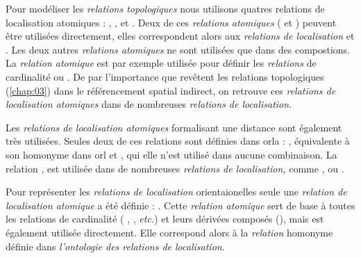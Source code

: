Pour modéliser les \emph{relations topologiques} nous utilisons
quatres relations de localisation atomiques :
,
,
 et . Deux de
ces \emph{relations atomiques} ( et
) peuvent être utilisées
directement, elles correspondent alors aux \emph{relations de
  localisation}  et
. Les deux autres \emph{relations
  atomiques} ne sont utilisées que dans des compostions. La
\emph{relation atomique}  est par
exemple utilisée pour définir les \emph{relations} de cardinalité
 ou
. De par l'importance que
revêtent les relations topologiques (\autoref{chap:03}) dans le
référencement spatial indirect, on retrouve ces \emph{relations de
  localisation atomiques} dans de nombreuses \emph{relations de
  localisation.}

Les \emph{relations de localisation atomiques} formalisant une
distance sont également très utilisées. Seules deux de ces relations
sont définies dans \ac{orla}
: ,
équivalente à son homonyme dans \ac{orl} et
, qui elle n'est utilisé dans
aucune combinaison. La relation
,
est utilisée dans de nombreuses \emph{relations de localisation,}
comme ,  ou
.

Pour représenter les \emph{relations de localisation} orientaionelles
seule une \emph{relation de localisation atomique} a été définie :
. Cette \emph{relation atomique}
sert de base à toutes les relations de cardinalité (\ie
{}, , \emph{etc.}) et
leurs dérivées composés (\eg {}),
mais est également utilisée directement. Elle correspond alors à la
\emph{relation} homonyme définie dans \emph{l'ontologie des relations
  de localisation}.

